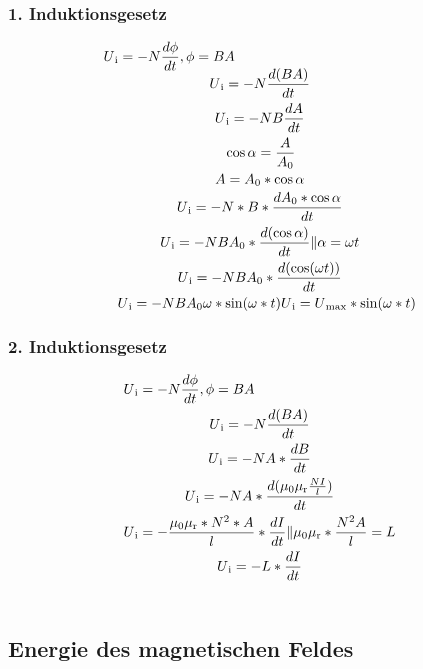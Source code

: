 \documentclass{scrartcl}
\begin{document}
        \subsubsection*{1. Induktionsgesetz}
        \begin{equation}
            \begin{multlined}
                U\textsubscript{i} = -N\frac{d\phi}{dt}, \phi =BA \\
                U\textsubscript{i} = -N\frac{d(BA)}{dt} \\
                U\textsubscript{i} = -NB\frac{dA}{dt} \\
                \cos\alpha = \frac{A}{A\textsubscript{0}} \\
                A = A\textsubscript{0}*\cos\alpha \\
                U\textsubscript{i}=-N*B*\frac{dA\textsubscript{0}*\cos\alpha}{dt} \\
                U\textsubscript{i}=-NBA\textsubscript{0}*\frac{d(\cos\alpha)}{dt} \| \alpha=\omega t \\
                U\textsubscript{i}=-NBA\textsubscript{0}*\frac{d(\cos(\omega t))}{dt} \\
                U\textsubscript{i}=-NBA\textsubscript{0}\omega*\sin(\omega*t)
                U\textsubscript{i}= U\textsubscript{$\max$}* \sin(\omega*t)
            \end{multlined}
        \end{equation}
        \subsubsection*{2. Induktionsgesetz}
            \begin{equation}
                \begin{multlined}
                    U\textsubscript{i} = -N\frac{d\phi}{dt}, \phi =BA \\
                    U\textsubscript{i} = -N\frac{d(BA)}{dt} \\
                    U\textsubscript{i} = -NA*\frac{dB}{dt} \\
                    U\textsubscript{i} = -NA*\frac{d(\mu\textsubscript{0}\mu\textsubscript{r}\frac{NI}{l})}{dt} \\
                    U\textsubscript{i} = -\frac{\mu\textsubscript{0}\mu\textsubscript{r}*N^2*A}{l}*\frac{dI}{dt} \| \mu\textsubscript{0}\mu\textsubscript{r}*\frac{N^2A}{l}=L \\
                    U\textsubscript{i} = -L*\frac{dI}{dt} \\
                \end{multlined}
            \end{equation}
        \subsection*{Energie des magnetischen Feldes}
            
\end{document}
